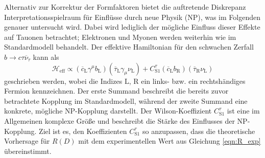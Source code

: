 Alternativ zur Korrektur der Formfaktoren bietet die auftretende Diskrepanz Interpretationsspielraum für Einflüsse durch neue Physik (NP), was im Folgenden genauer untersucht wird.
Dabei wird lediglich der mögliche Einfluss dieser Effekte auf Tauonen betrachtet; Elektronen und Myonen werden weiterhin wie im Standardmodell behandelt.
Der effektive Hamiltonian für den schwachen Zerfall $b \to c \tau \overline{\nu}_\tau$ kann als
\begin{equation}
  \mathcal{H}_\text{eff} \propto (\overline{c}_\text{L} \gamma^\mu b_\text{L})(\overline{\tau}_\text{L} \gamma_\mu \nu_\text{L} ) +  C_{\text{S}1}^\tau (\overline {c}_\text{L} b_\text{R}) (\overline{\tau}_\text{R} \nu_\text{L})
\end{equation}
geschrieben werden, wobei die Indizes $\text{L}$, $\text{R}$ ein links- bzw. ein rechtshändiges Fermion kennzeichnen.
Der erste Summand beschreibt die bereits zuvor betrachtete Kopplung im Standardmodell, während der zweite Summand eine konkrete, mögliche NP-Kopplung darstellt.
Der Wilson-Koeffizient $C_{\text{S}1}^\tau$ ist eine im Allgemeinen komplexe Größe und beschreibt die Stärke des Einflusses der NP-Kopplung.
Ziel ist es, den Koeffizienten $C_{\text{S}1}^\tau$ so anzupassen, dass die theoretische Vorhersage für $R(D)$ mit dem experimentellen Wert aus Gleichung \eqref{eqn:R_exp} übereinstimmt.


